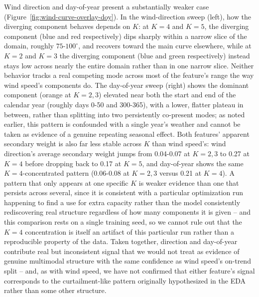 Wind direction and day-of-year present a substantially weaker case (Figure~\ref{fig:wind-curve-overlay-doy}).
In the wind-direction sweep (left), how the diverging component behaves depends on $K$: at $K=4$ and $K=5$, the diverging component (blue and red respectively) dips sharply within a narrow slice of the domain, roughly $75$-$100^\circ$, and recovers toward the main curve elsewhere, while at $K=2$ and $K=3$ the diverging component (blue and green respectively) instead stays low across nearly the entire domain rather than in one narrow slice.
Neither behavior tracks a real competing mode across most of the feature's range the way wind speed's components do.
The day-of-year sweep (right) shows the dominant component (orange at $K=2,3$) elevated near both the start and end of the calendar year (roughly days 0-50 and 300-365), with a lower, flatter plateau in between, rather than splitting into two persistently co-present modes; as noted earlier, this pattern is confounded with a single year's weather and cannot be taken as evidence of a genuine repeating seasonal effect.
Both features' apparent secondary weight is also far less stable across $K$ than wind speed's: wind direction's average secondary weight jumps from 0.04-0.07 at $K=2,3$ to 0.27 at $K=4$ before dropping back to 0.17 at $K=5$, and day-of-year shows the same $K=4$-concentrated pattern (0.06-0.08 at $K=2,3$ versus 0.21 at $K=4$).
A pattern that only appears at one specific $K$ is weaker evidence than one that persists across several, since it is consistent with a particular optimization run happening to find a use for extra capacity rather than the model consistently rediscovering real structure regardless of how many components it is given -- and this comparison rests on a single training seed, so we cannot rule out that the $K=4$ concentration is itself an artifact of this particular run rather than a reproducible property of the data.
Taken together, direction and day-of-year contribute real but inconsistent signal that we would not treat as evidence of genuine multimodal structure with the same confidence as wind speed's on-trend split -- and, as with wind speed, we have not confirmed that either feature's signal corresponds to the curtailment-like pattern originally hypothesized in the EDA rather than some other structure.


